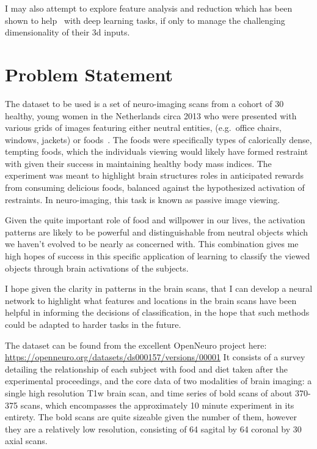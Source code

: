 \documentclass[10pt,twocolumn,letterpaper]{article}
\begin{document}
I may also attempt to explore feature analysis and reduction which has been shown to
help~\cite{shi2018feature} with deep learning tasks, if only to manage the challenging
dimensionality of their 3d inputs.



\section{Problem Statement}\label{sec:problem-statement}
The dataset to be used is a set of neuro-imaging scans from a cohort of 30 healthy, young women in the
Netherlands circa 2013 who were presented with various grids of images featuring
either neutral entities, (e.g.\ office chairs, windows, jackets) or foods~\cite{smeets2013allured}.
The foods were specifically types of calorically dense, tempting foods, which the individuals viewing would likely
have formed restraint with given their success in maintaining healthy body mass indices.
The experiment was meant to highlight brain structures roles in anticipated rewards from consuming delicious foods,
balanced against the hypothesized activation of restraints.
In neuro-imaging, this task is known as passive image viewing.

Given the quite important role of food and willpower in our lives, the activation patterns are likely to be powerful
and distinguishable from neutral objects which we haven't evolved to be nearly as concerned with.
This combination gives me high hopes of success in this specific application of learning to classify the viewed
objects through brain activations of the subjects.

I hope given the clarity in patterns in the brain scans, that I can develop a neural network to highlight what
features and locations in the brain scans have been helpful in informing the decisions of classification, in the
hope that such methods could be adapted to harder tasks in the future.

The dataset can be found from the excellent
OpenNeuro project here: \url{https://openneuro.org/datasets/ds000157/versions/00001}
It consists of a survey detailing the relationship of each subject with food and diet taken after the experimental
proceedings, and the core data of two modalities of brain imaging: a single high resolution T1w brain scan,
and time series of bold scans of about 370-375 scans, which encompasses the approximately 10 minute experiment
in its entirety.
The bold scans are quite sizeable given the number of them, however they are a relatively low resolution, consisting
of 64 sagital by 64 coronal by 30 axial scans.
\end{document}
